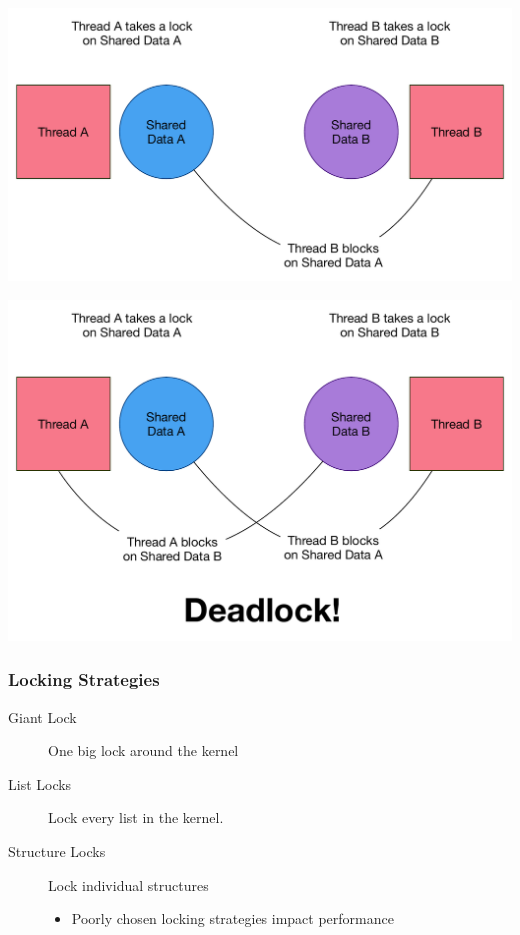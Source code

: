 \documentclass[pdftex]{beamer} %
\begin{document}
\begin{frame}
\centering
      \includegraphics[width=\textwidth]{../../figures/deadlock4.pdf}
\end{frame}

\begin{frame}
\centering
      \includegraphics[width=\textwidth]{../../figures/deadlock5.pdf}
\end{frame}

\begin{frame}
  \frametitle{Locking Strategies}
  \begin{description}
  \item [Giant Lock] One big lock around the kernel
  \item [List Locks] Lock every list in the kernel.
  \item [Structure Locks] Lock individual structures
    \begin{itemize}
    \item Poorly chosen locking strategies impact performance
    \end{itemize}
  \end{description}
\end{frame}
\end{document}
